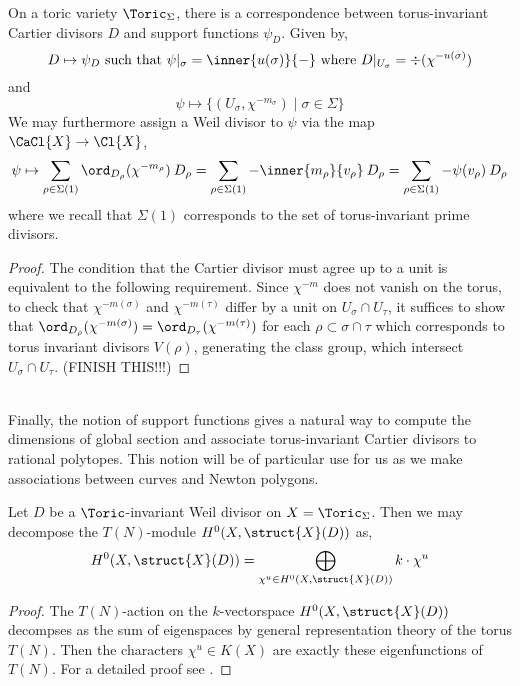 \begin{proposition}
On a toric variety $\Toric_\Sigma$, there is a correspondence between torus-invariant Cartier divisors $D$ and support functions $\psi_D$. Given by,
\[ D \mapsto \psi_D \text{ such that } \psi|_\sigma = \inner{u(\sigma)}{-} \text{ where } D |_{U_\sigma} =  \div{(\chi^{-u(\sigma)})} \]
and
\[ \psi \mapsto \{ (U_\sigma, \chi^{-m_\sigma}) \mid \sigma \in \Sigma \} \] 
We may furthermore assign a Weil divisor to $\psi$ via the map $\CaCl{X} \to \Cl{X}$,
\[ \psi \mapsto \sum_{\rho \in \Sigma(1)} \ord_{D_\rho}(\chi^{-m_\rho}) \: D_\rho = \sum_{\rho \in \Sigma(1)} -\inner{m_\rho}{v_\rho} \: D_\rho = \sum_{\rho \in \Sigma(1)} -\psi(v_\rho) \: D_\rho \] 
where we recall that $\Sigma(1)$ corresponds to the set of torus-invariant prime divisors.
\end{proposition}

\begin{proof}
The condition that the Cartier divisor must agree up to a unit is equivalent to the following requirement. Since $\chi^{-m}$ does not vanish on the torus, to check that $\chi^{-m(\sigma)}$ and $\chi^{-m(\tau)}$ differ by a unit on $U_\sigma \cap U_\tau$, it suffices to show that $\ord_{D_\rho}(\chi^{-m(\sigma)}) = \ord_{D_\tau}(\chi^{-m(\tau)})$ for each $\rho \subset \sigma \cap \tau$ which corresponds to torus invariant divisors $V(\rho)$, generating the class group, which intersect $U_\sigma \cap U_\tau$. (FINISH THIS!!!)
\end{proof}
\noindent\\
Finally, the notion of support functions gives a natural way to compute the dimensions of global section and associate torus-invariant Cartier divisors to rational polytopes. This notion will be of particular use for us as we make associations between curves and Newton polygons.

\begin{thm}
Let $D$ be a $\Toric$-invariant Weil divisor on $X = \Toric_\Sigma$. Then we may decompose the $T(N)$-module $H^0(X, \struct{X}(D))$ as,
\[ H^0(X, \struct{X}(D)) = \bigoplus_{\chi^u \in H^0(X, \struct{X}(D))} k \cdot \chi^u \]
\end{thm}

\begin{proof}
The $T(N)$-action on the $k$-vectorspace $H^0(X, \struct{X}(D))$  decompses as the sum of eigenspaces by general representation theory of the torus $T(N)$. Then the characters $\chi^u \in K(X)$ are exactly these eigenfunctions of $T(N)$. For a detailed proof see \cite[Prop. 4.3.2]{cox}.
\end{proof}

